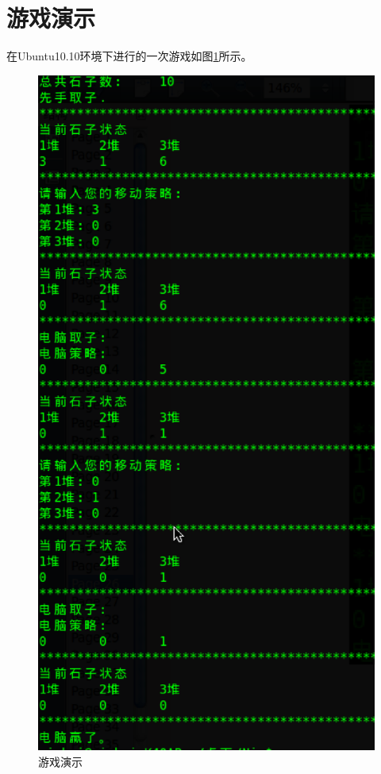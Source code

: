 \documentclass[UTF8,nofonts,cs4size]{ctexrep}
\begin{document}
\section{游戏演示}
在Ubuntu10.10环境下进行的一次游戏如图\ref{yunxing}所示。
\begin{figure}[htp]
\centering
\includegraphics[scale=0.8]{002.eps}
\caption{游戏演示}
\label{yunxing}
\end{figure}
\end{document}
